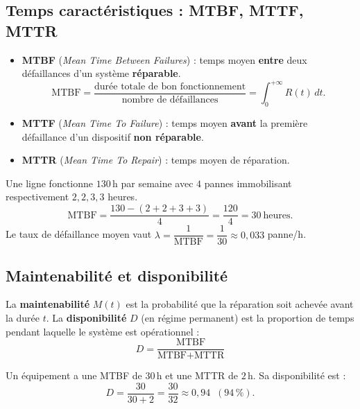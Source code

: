 \documentclass[a4paper,11pt]{article}
\begin{document}
\subsection{Temps caractéristiques : MTBF, MTTF, MTTR}

\begin{definition}
\begin{itemize}
  \item \textbf{MTBF} (\textit{Mean Time Between Failures}) : temps moyen \textbf{entre} deux défaillances d'un système \textbf{réparable}.
  \[
  \text{MTBF} = \frac{\text{durée totale de bon fonctionnement}}{\text{nombre de défaillances}} = \int_0^{+\infty} R(t)\,dt.
  \]
  \item \textbf{MTTF} (\textit{Mean Time To Failure}) : temps moyen \textbf{avant} la première défaillance d'un dispositif \textbf{non réparable}.
  \item \textbf{MTTR} (\textit{Mean Time To Repair}) : temps moyen de réparation.
\end{itemize}
\end{definition}

\begin{exemple}
Une ligne fonctionne $130$\,h par semaine avec $4$ pannes immobilisant respectivement $2, 2, 3, 3$ heures.
\[
\text{MTBF} = \frac{130 - (2+2+3+3)}{4} = \frac{120}{4} = 30\ \text{heures.}
\]
Le taux de défaillance moyen vaut $\lambda = \dfrac{1}{\text{MTBF}} = \dfrac{1}{30} \approx 0{,}033$ panne/h.
\end{exemple}

\subsection{Maintenabilité et disponibilité}

\begin{definition}
La \textbf{maintenabilité} $M(t)$ est la probabilité que la réparation soit achevée avant la durée $t$. La \textbf{disponibilité} $D$ (en régime permanent) est la proportion de temps pendant laquelle le système est opérationnel :
\[
\boxed{D = \frac{\text{MTBF}}{\text{MTBF} + \text{MTTR}}}
\]
\end{definition}

\begin{exemple}
Un équipement a une MTBF de $30$\,h et une MTTR de $2$\,h. Sa disponibilité est :
\[
D = \frac{30}{30 + 2} = \frac{30}{32} \approx 0{,}94 \;\; (94\,\%).
\]
\end{exemple}
\end{document}
